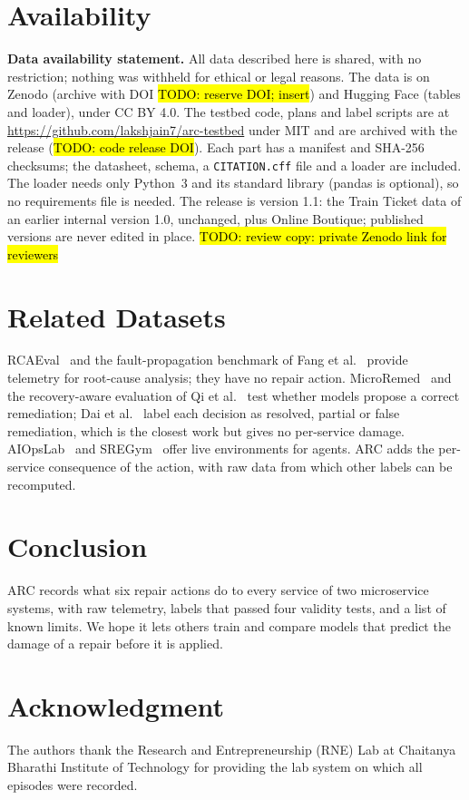 \documentclass[10pt,conference]{IEEEtran}
\newcommand{\todo}[1]{\hl{TODO: #1}}
\begin{document}
\section{Availability}
\textbf{Data availability statement.} All data described here is shared, with no restriction; nothing was withheld for ethical or legal reasons. The data is on Zenodo (archive with DOI \todo{reserve DOI; insert}) and Hugging Face (tables and loader), under CC BY 4.0. The testbed code, plans and label scripts are at \url{https://github.com/lakshjain7/arc-testbed} under MIT and are archived with the release (\todo{code release DOI}). Each part has a manifest and SHA-256 checksums; the datasheet, schema, a \texttt{CITATION.cff} file and a loader are included. The loader needs only Python~3 and its standard library (pandas is optional), so no requirements file is needed. The release is version 1.1: the Train Ticket data of an earlier internal version 1.0, unchanged, plus Online Boutique; published versions are never edited in place. \todo{review copy: private Zenodo link for reviewers}

\section{Related Datasets}
RCAEval~\cite{rcaeval} and the fault-propagation benchmark of Fang et al.~\cite{fang} provide telemetry for root-cause analysis; they have no repair action. MicroRemed~\cite{microremed} and the recovery-aware evaluation of Qi et al.~\cite{r7} test whether models propose a correct remediation; Dai et al.~\cite{dai} label each decision as resolved, partial or false remediation, which is the closest work but gives no per-service damage. AIOpsLab~\cite{aiopslab} and SREGym~\cite{sregym} offer live environments for agents. ARC adds the per-service consequence of the action, with raw data from which other labels can be recomputed.

\section{Conclusion}
ARC records what six repair actions do to every service of two microservice systems, with raw telemetry, labels that passed four validity tests, and a list of known limits. We hope it lets others train and compare models that predict the damage of a repair before it is applied.

\section*{Acknowledgment}
The authors thank the Research and Entrepreneurship (RNE) Lab at Chaitanya Bharathi Institute of Technology for providing the lab system on which all episodes were recorded.
\end{document}
